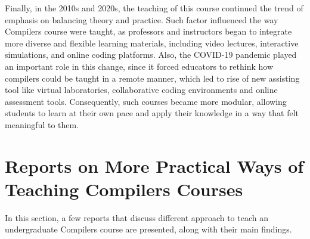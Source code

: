 Finally, in the 2010s and 2020s, the teaching of this course continued the trend of emphasis on balancing theory and practice. Such factor influenced the way Compilers course were taught, as professors and instructors began to integrate more diverse and flexible learning materials, including video lectures, interactive simulations, and online coding platforms. Also, the COVID-19 pandemic played an important role in this change, since it forced educators to rethink how compilers could be taught in a remote manner, which led to rise of new assisting tool like virtual laboratories, collaborative coding environments and online assessment tools. Consequently, such courses became more modular, allowing students to learn at their own pace and apply their knowledge in a way that felt meaningful to them.

\section{Reports on More Practical Ways of Teaching Compilers Courses}
In this section, a few reports that discuss different approach to teach an undergraduate Compilers course are presented, along with their main findings.

